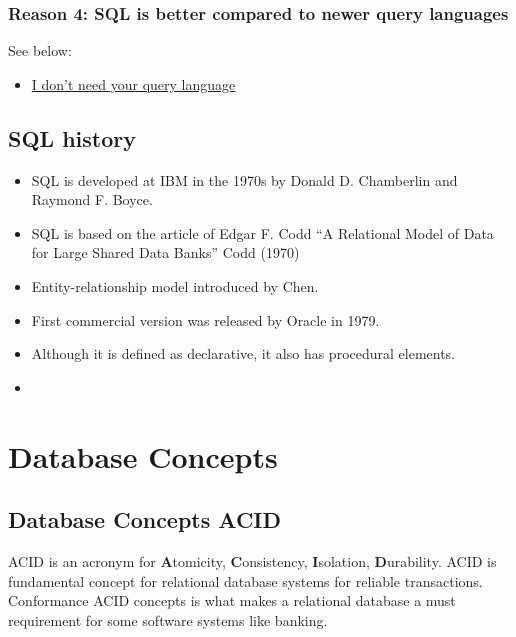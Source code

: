 \documentclass[
  letterpaper,
  DIV=11,
  numbers=noendperiod]{scrreprt}
\providecommand{\tightlist}{%
  \setlength{\itemsep}{0pt}\setlength{\parskip}{0pt}}\usepackage{longtable,booktabs,array}
\begin{document}
\section*{Reason 4: SQL is better compared to newer query
languages}\label{reason-4-sql-is-better-compared-to-newer-query-languages}


See below:

\begin{itemize}
\tightlist
\item
  \href{https://antonz.org/fancy-ql/}{I don't need your query language}
\end{itemize}

\chapter{SQL history}\label{sql-history}

\begin{itemize}
\item
  SQL is developed at IBM in the 1970s by Donald D. Chamberlin and
  Raymond F. Boyce.
\item
  SQL is based on the article of Edgar F. Codd ``A Relational Model of
  Data for Large Shared Data Banks'' Codd (1970)
\item
  Entity-relationship model introduced by Chen.
\item
  First commercial version was released by Oracle in 1979.
\item
  Although it is defined as declarative, it also has procedural
  elements.
\item
\end{itemize}

\part{Database Concepts}

\chapter{Database Concepts ACID}\label{database-concepts-acid}

ACID is an acronym for \textbf{A}tomicity, \textbf{C}onsistency,
\textbf{I}solation, \textbf{D}urability. ACID is fundamental concept for
relational database systems for reliable transactions. Conformance ACID
concepts is what makes a relational database a must requirement for some
software systems like banking.
\end{document}
